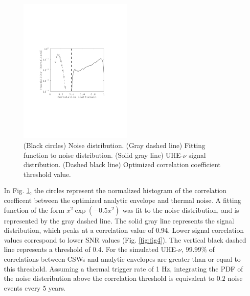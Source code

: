 \documentclass[amsmath,amssymb,aps,prd,10pt,twocolumn,showkeys]{revtex4}
\begin{document}
\begin{itemize}
\begin{figure}
\centering
\includegraphics[width=0.5\textwidth,trim=3.25cm 8.25cm 4.5cm 9.0cm,clip=true]{Aug15_plot1.pdf}
\caption{\label{fig:fig3} (Black circles) Noise distribution. (Gray dashed line) Fitting function to noise distribution.  (Solid gray line) UHE-$\nu$ signal distribution.  (Dashed black line) Optimized correlation coefficient threshold value.}
\end{figure}

In Fig. \ref{fig:fig3}, the circles represent the normalized histogram of the correlation coefficent between the optimized analytic envelope and thermal noise.  A fitting function of the form $x^2 \exp(-0.5 x^2)$ was fit to the noise distribution, and is represented by the gray dashed line.  The solid gray line represents the signal distribution, which peaks at a correlation value of 0.94.  Lower signal correlation values correspond to lower SNR values (Fig. \ref{fig:fig4}).  The vertical black dashed line represents a threshold of 0.4.  For the simulated UHE-$\nu$, 99.99\% of correlations between CSWs and analytic envelopes are greater than or equal to this threshold.  Assuming a thermal trigger rate of 1 Hz, integrating the PDF of the noise disteribution above the correlation threshold is equivalent to 0.2 noise events every 5 years.


\end{itemize}
\end{document}
